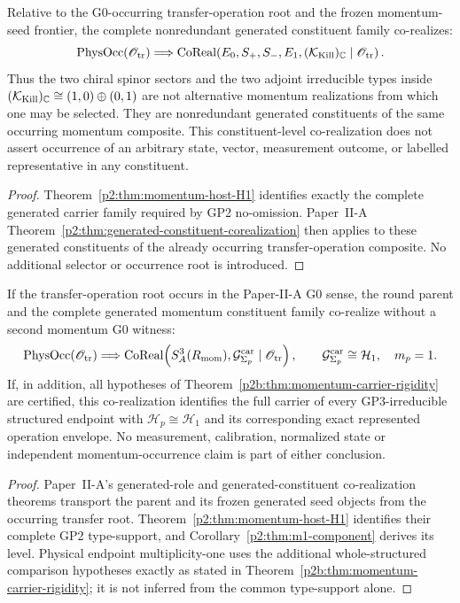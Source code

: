 \documentclass[12pt,a4paper]{article}
\begin{document}
\begin{corollary}
\label{p2b:cor:momentum-seed-constituent-corealization}
Relative to the G0-occurring transfer-operation root and the frozen
momentum-seed frontier, the complete nonredundant generated constituent family
co-realizes:
\[
 \operatorname{PhysOcc}(\mathscr O_{\rm tr})
 \Longrightarrow
 \operatorname{CoReal}\!\left(
 E_0,S_+,S_-,E_1,(\mathcal K_{\rm Kill})_{\mathbb C}
 \mid \mathscr O_{\rm tr}\right).
\]
Thus the two chiral spinor sectors and the two adjoint irreducible types inside
\((\mathcal K_{\rm Kill})_{\mathbb C}\cong(1,0)\oplus(0,1)\) are not
alternative momentum realizations from which one may be selected.  They are
nonredundant generated constituents of the same occurring momentum composite.
This constituent-level co-realization does not assert occurrence of an
arbitrary state, vector, measurement outcome, or labelled representative in
any constituent.
\end{corollary}

\begin{proof}
Theorem~\ref{p2:thm:momentum-host-H1} identifies exactly the complete generated
carrier family required by GP2 no-omission.  Paper~II-A
Theorem~\ref{p2:thm:generated-constituent-corealization} then applies to these
generated constituents of the already occurring transfer-operation composite.
No additional selector or occurrence root is introduced.
\end{proof}

\begin{corollary}
\label{p2b:cor:physical-momentum-carrier-corealization}
If the transfer-operation root occurs in the Paper-II-A G0 sense, the
round parent and the complete generated momentum constituent family
co-realize without a second momentum G0 witness:
\[
 \operatorname{PhysOcc}(\mathscr O_{\rm tr})\Longrightarrow
 \operatorname{CoReal}\!\left(
 S^3_A(R_{\mathrm{mom}}),\mathcal G^{\rm car}_{\Sigma_p}
 \mid\mathscr O_{\rm tr}\right),\qquad
 \mathcal G^{\rm car}_{\Sigma_p}\cong\mathcal H_1,
 \quad m_p=1.
\]
If, in addition, all hypotheses of
Theorem~\ref{p2b:thm:momentum-carrier-rigidity} are certified, this
co-realization identifies the full carrier of every GP3-irreducible
structured endpoint with \(\mathcal H_p\cong\mathcal H_1\) and its
corresponding exact represented operation envelope.  No measurement,
calibration, normalized state or independent momentum-occurrence claim
is part of either conclusion.
\end{corollary}
\begin{proof}
Paper~II-A's generated-role and generated-constituent co-realization
theorems transport the parent and its frozen generated seed objects from
the occurring transfer root.  Theorem~\ref{p2:thm:momentum-host-H1}
identifies their complete GP2 type-support, and
Corollary~\ref{p2:thm:m1-component} derives its level.  Physical
endpoint multiplicity-one uses the additional whole-structured
comparison hypotheses exactly as stated in
Theorem~\ref{p2b:thm:momentum-carrier-rigidity}; it is not inferred
from the common type-support alone.
\end{proof}
\end{document}

